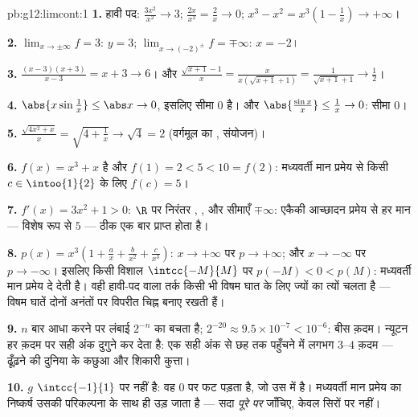 \begin{solution}{pb:g12:limcont:1}
\textbf{1.} हावी पद: $\frac{3x^2}{x^2} \to 3$; $\frac{2x}{x^2} = \frac2x \to 0$; $x^3 - x^2 = x^3\left(1 - \frac1x\right) \to +\infty$।

\textbf{2.} $\lim_{x \to \pm\infty} f = 3$:  $y = 3$; $\lim_{x \to (-2)^\pm} f = \mp\infty$:  $x = -2$।

\textbf{3.} $\frac{(x-3)(x+3)}{x - 3} = x + 3 \to 6$। और $\frac{\sqrt{x+1} - 1}{x} = \frac{x}{x(\sqrt{x+1} + 1)} =
\frac{1}{\sqrt{x+1} + 1} \to \frac12$।

\textbf{4.} $\abs{x \sin\frac1x} \leq \abs x \to 0$, इसलिए सीमा $0$ है। और $\abs{\frac{\sin x}{x}} \leq \frac1x \to 0$: सीमा $0$।

\textbf{5.} $\frac{\sqrt{4x^2 + x}}{x} =
\sqrt{4 + \frac1x} \to \sqrt4 = 2$ (वर्गमूल का , संयोजन)।

\textbf{6.} $f(x) = x^3 + x$  है और $f(1) = 2 < 5 < 10 = f(2)$: मध्यवर्ती मान प्रमेय से किसी $c \in \intoo{1}{2}$ के लिए
$f(c) = 5$।

\textbf{7.} $f'(x) = 3x^2 + 1 > 0$: $\R$ पर निरंतर , , और सीमाएँ $\mp\infty$: एकैकी
आच्छादन प्रमेय से हर मान --- विशेष रूप से $5$ --- ठीक एक बार प्राप्त होता
है।

\textbf{8.} $p(x) = x^3\left(1 + \frac ax + \frac{b}{x^2} +
\frac{c}{x^3}\right)$: $x \to +\infty$ पर $p \to +\infty$; और $x \to -\infty$ पर $p \to -\infty$। इसलिए किसी विशाल
 $\intcc{-M}{M}$ पर $p(-M) < 0 < p(M)$: मध्यवर्ती मान प्रमेय  दे देती है। वही हावी-पद वाला
तर्क किसी भी विषम घात के लिए ज्यों का त्यों चलता है --- विषम घातें दोनों
अनंतों पर विपरीत चिह्न बनाए रखती हैं।

\textbf{9.} $n$ बार आधा करने पर लंबाई $2^{-n}$ का  बचता है; $2^{-20} \approx 9.5 \times 10^{-7} < 10^{-6}$: बीस
क़दम। न्यूटन हर क़दम पर सही अंक दुगुने कर देता है: एक सही अंक से छह तक पहुँचने
में लगभग $3$--$4$ क़दम ---  ढूँढ़ने की दुनिया के कछुआ और शिकारी कुत्ता।

\textbf{10.} $g$ $\intcc{-1}{1}$ पर  नहीं है: वह $0$ पर फट पड़ता है, जो उस
 में है। मध्यवर्ती मान प्रमेय का निष्कर्ष उसकी परिकल्पना के साथ ही उड़
जाता है ---  सदा \emph{पूरे  पर} जाँचिए, केवल सिरों पर नहीं।


\end{solution}

